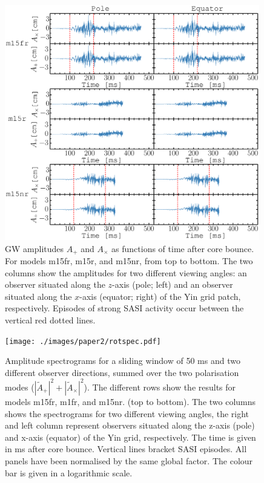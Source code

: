 \begin{figure}[h]
\centering                            
\includegraphics[width=0.99\textwidth]{./images/paper2/amps.pdf}
\caption{GW amplitudes $A_+$ and $A_\times$ as functions of time after core bounce.
  For models m15fr, m15r, and m15nr, from top to bottom. 
  The two columns show the amplitudes for two different viewing angles: an observer
  situated along the $z$-axis (pole; left) and an observer situated along the $x$-axis (equator; right) of the Yin grid patch, respectively.
  Episodes of strong SASI activity occur between the vertical red dotted lines.  \label{figp2:amps}}
\end{figure}
\begin{figure}
\centering                            
\texttt{[image: ./images/paper2/rotspec.pdf]}
\caption{Amplitude spectrograms for a sliding window of 50 ms and two different observer
  directions, summed over the two polarisation modes 
  ($|\widetilde{A}_+|^2 + |\widetilde{A}_\times|^2$). The
  different rows show the results for models m15fr, m1fr, and m15nr. (top to bottom).
  The two columns shows the spectrograms for two different viewing angles, the right and left column represent
  observers situated along the z-axis (pole) and x-axis (equator) of the Yin grid, respectively.
  The time is given in ms after core bounce. Vertical lines bracket SASI episodes. All panels have been normalised by the same global factor.
  The colour bar is given in a logarithmic scale. \label{figp2:spec}}
\end{figure}

